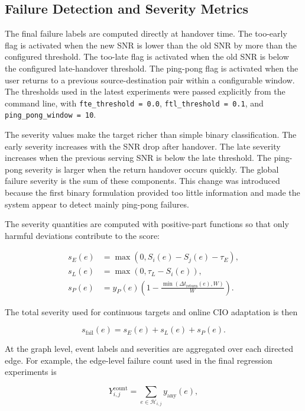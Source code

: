 \documentclass[11pt, a4paper, twoside]{article}
\begin{document}
\subsection{Failure Detection and Severity Metrics}

The final failure labels are computed directly at handover time. The too-early flag is activated when the new SNR is lower than the old SNR by more than the configured threshold. The too-late flag is activated when the old SNR is below the configured late-handover threshold. The ping-pong flag is activated when the user returns to a previous source-destination pair within a configurable window. The thresholds used in the latest experiments were passed explicitly from the command line, with \texttt{fte\_threshold = 0.0}, \texttt{ftl\_threshold = 0.1}, and \texttt{ping\_pong\_window = 10}.

The severity values make the target richer than simple binary classification. The early severity increases with the SNR drop after handover. The late severity increases when the previous serving SNR is below the late threshold. The ping-pong severity is larger when the return handover occurs quickly. The global failure severity is the sum of these components. This change was introduced because the first binary formulation provided too little information and made the system appear to detect mainly ping-pong failures.

The severity quantities are computed with positive-part functions so that only harmful deviations contribute to the score:

\begin{align}
s_E(e) &= \max\left(0, S_i(e) - S_j(e) - \tau_E\right), \\
s_L(e) &= \max\left(0, \tau_L - S_i(e)\right), \\
s_P(e) &= y_P(e)\left(1 - \frac{\min(\Delta t_{\text{return}}(e), W)}{W}\right).
\end{align}

The total severity used for continuous targets and online CIO adaptation is then

\begin{equation}
s_{\text{fail}}(e) = s_E(e) + s_L(e) + s_P(e).
\end{equation}

At the graph level, event labels and severities are aggregated over each directed edge. For example, the edge-level failure count used in the final regression experiments is

\begin{equation}
Y_{i,j}^{\text{count}} = \sum_{e \in \mathcal{H}_{i,j}} y_{\text{any}}(e),
\end{equation}
\end{document}
